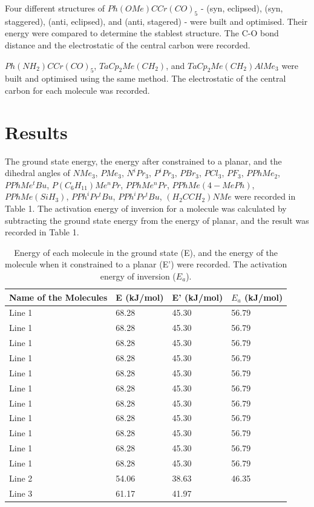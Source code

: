 \documentclass[twocolumn]{article} %
\begin{document}
Four different structures of $Ph(OMe)CCr(CO)_5$ - (syn, eclipsed), (syn, staggered), (anti, eclipsed), and (anti, stagered) - were built and optimised. Their energy were compared to determine the stablest structure. The C-O bond distance and the electrostatic of the central carbon were recorded. 

$Ph(NH_2)CCr(CO)_5$, $TaCp_2Me(CH_2)$, and $TaCp_2Me(CH_2)AlMe_3$ were built and optimised using the same method. The electrostatic of the central carbon for each molecule was recorded. 




\section{Results}

The ground state energy, the energy after constrained to a planar, and the dihedral angles of $NMe_3$, $PMe_3$, $N^iPr_3$, $P^iPr_3$, $PBr_3$, $PCl_3$, $PF_3$, $PPhMe_2$, $PPhMe^tBu$, $P(C_6H_{11})Me^nPr$, $PPhMe^nPr$, $PPhMe(4-MePh)$, $PPhMe(SiH_3)$, $PPh^iPr^tBu$, $PPh^iPr^tBu$, $(H_2CCH_2)NMe$  were recorded in Table 1. The activation energy of inversion for a molecule was calculated by subtracting the ground state energy from the energy of planar, and the result was recorded in Table 1. 

\begin{table}[h] 
\caption{Energy of each molecule in the ground state (E), and the energy of the molecule when it constrained to a planar (E') were recorded. The activation energy of inversion ($E_a$).}
\begin{tabular}{L{.7in}C{.7in}C{.7in}C{.7in}}\toprule
 Name of the Molecules & E (kJ/mol) & E' (kJ/mol) & $E_a$ (kJ/mol)\\\midrule
Line 1 & 68.28 & 45.30 & 56.79 \\
Line 1 & 68.28 & 45.30 & 56.79 \\
Line 1 & 68.28 & 45.30 & 56.79 \\
Line 1 & 68.28 & 45.30 & 56.79 \\
Line 1 & 68.28 & 45.30 & 56.79 \\
Line 1 & 68.28 & 45.30 & 56.79 \\
Line 1 & 68.28 & 45.30 & 56.79 \\
Line 1 & 68.28 & 45.30 & 56.79 \\
Line 1 & 68.28 & 45.30 & 56.79 \\
Line 1 & 68.28 & 45.30 & 56.79 \\
Line 1 & 68.28 & 45.30 & 56.79 \\
Line 2 & 54.06 & 38.63 & 46.35 \\\midrule %
Line 3 & 61.17 & 41.97 & \\\bottomrule

\end{tabular}
\end{table}
\end{document}
